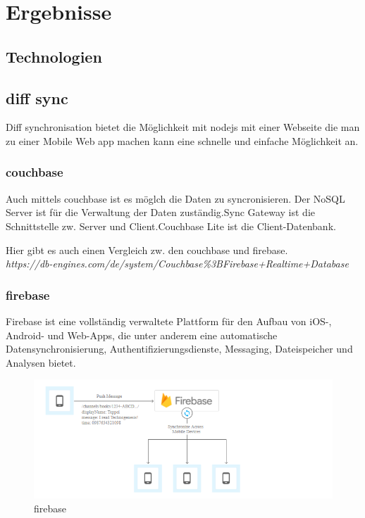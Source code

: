 
\section{Ergebnisse}
\label{sec:Ergebnisse}



\subsection{Technologien}
\subsection{diff sync}
Diff synchronisation bietet die Möglichkeit mit nodejs mit einer Webseite die man zu einer Mobile Web app machen kann eine schnelle und einfache Möglichkeit an.

\subsubsection{couchbase}
Auch mittels couchbase ist es möglch die Daten zu syncronisieren.
Der NoSQL Server ist für die Verwaltung der Daten zuständig.Sync Gateway ist die Schnittstelle zw. Server und Client.Couchbase Lite ist die Client-Datenbank.\cite{couchbase}

Hier gibt es auch einen Vergleich zw. den couchbase und firebase.\\ \textit{https://db-engines.com/de/system/Couchbase\%3BFirebase+Realtime+Database}
\subsubsection{firebase}

Firebase ist eine vollständig verwaltete Plattform für den Aufbau von iOS-, Android- und Web-Apps, die unter anderem eine automatische Datensynchronisierung, Authentifizierungsdienste, Messaging, Dateispeicher und Analysen bietet.\



\begin{figure}[h]
	\centering
	\includegraphics[width=0.7\linewidth]{images/firebase}
	\caption{firebase}
	\label{fig:firebase}
\end{figure}

